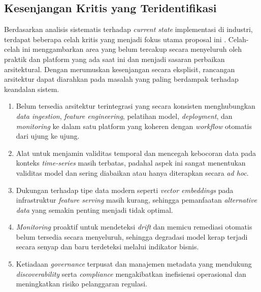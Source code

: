 \subsection{Kesenjangan Kritis yang Teridentifikasi}

Berdasarkan analisis sistematis terhadap \textit{current state} implementasi di industri, terdapat beberapa celah kritis yang menjadi fokus utama proposal ini \autocite{polyzotis2018data,stoyanovich2020responsible,shankar2022operationalizing}. Celah-celah ini menggambarkan area yang belum tercakup secara menyeluruh oleh praktik dan platform yang ada saat ini dan menjadi sasaran perbaikan arsitektural. Dengan merumuskan kesenjangan secara eksplisit, rancangan arsitektur dapat diarahkan pada masalah yang paling berdampak terhadap keandalan sistem.

\vspace{0.5em}
\begin{enumerate}
    \item Belum tersedia arsitektur terintegrasi yang secara konsisten menghubungkan \textit{data ingestion}, \textit{feature engineering}, pelatihan model, \textit{deployment}, dan \textit{monitoring} ke dalam satu platform yang koheren dengan \textit{workflow} otomatis dari ujung ke ujung.

    \vspace{0.5em}

    \item Alat untuk menjamin validitas temporal dan mencegah kebocoran data pada konteks \textit{time-series} masih terbatas, padahal aspek ini sangat menentukan validitas model dan sering diabaikan atau hanya diterapkan secara \textit{ad hoc}. 
    
    \vspace{0.5em}

    \item Dukungan terhadap tipe data modern seperti \textit{vector embeddings} pada infrastruktur \textit{feature serving} masih kurang, sehingga pemanfaatan \textit{alternative data} yang semakin penting menjadi tidak optimal.

    \vspace{0.5em}

    \item \textit{Monitoring} proaktif untuk mendeteksi \textit{drift} dan memicu remediasi otomatis belum tersedia secara menyeluruh, sehingga degradasi model kerap terjadi secara senyap dan baru terdeteksi melalui indikator bisnis.

    \vspace{0.5em}

    \item Ketiadaan \textit{governance} terpusat dan manajemen metadata yang mendukung \textit{discoverability} serta \textit{compliance} mengakibatkan inefisiensi operasional dan meningkatkan risiko pelanggaran regulasi.

    \vspace{0.5em}
\end{enumerate}

